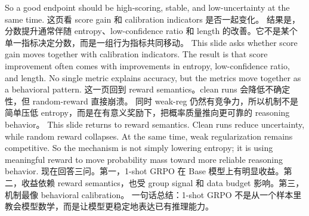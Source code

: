 {}So a good endpoint should be high-scoring, stable, and low-uncertainty at the same time.\markdownRendererInterblockSeparator
{}\markdownRendererHorizontalRule{}\markdownRendererInterblockSeparator
{}\markdownRendererInterblockSeparator
{}\markdownRendererInterblockSeparator
{}这页看 score gain 和 calibration indicators 是否一起变化。\markdownRendererInterblockSeparator
{}结果是，分数提升通常伴随 entropy、low-confidence ratio 和 length 的改善。它不是某个单一指标决定分数，而是一组行为指标共同移动。\markdownRendererInterblockSeparator
{}\markdownRendererInterblockSeparator
{}This slide asks whether score gain moves together with calibration indicators.\markdownRendererInterblockSeparator
{}The result is that score improvement often comes with improvements in entropy, low-confidence ratio, and length. No single metric explains accuracy, but the metrics move together as a behavioral pattern.\markdownRendererInterblockSeparator
{}\markdownRendererHorizontalRule{}\markdownRendererInterblockSeparator
{}\markdownRendererInterblockSeparator
{}\markdownRendererInterblockSeparator
{}这一页回到 reward semantics。clean runs 会降低不确定性，但 random-reward 直接崩溃。\markdownRendererInterblockSeparator
{}同时 weak-reg 仍然有竞争力，所以机制不是简单压低 entropy，而是在有意义奖励下，把概率质量推向更可靠的 reasoning behavior。\markdownRendererInterblockSeparator
{}\markdownRendererInterblockSeparator
{}This slide returns to reward semantics. Clean runs reduce uncertainty, while random reward collapses.\markdownRendererInterblockSeparator
{}At the same time, weak regularization remains competitive. So the mechanism is not simply lowering entropy; it is using meaningful reward to move probability mass toward more reliable reasoning behavior.\markdownRendererInterblockSeparator
{}\markdownRendererHorizontalRule{}\markdownRendererInterblockSeparator
{}\markdownRendererInterblockSeparator
{}\markdownRendererInterblockSeparator
{}现在回答三问。第一，1-shot GRPO 在 Base 模型上有明显收益。第二，收益依赖 reward semantics，也受 group signal 和 data budget 影响。第三，机制最像 behavioral calibration。\markdownRendererInterblockSeparator
{}一句话总结：1-shot GRPO 不是从一个样本里教会模型数学，而是让模型更稳定地表达已有推理能力。\markdownRendererInterblockSeparator
